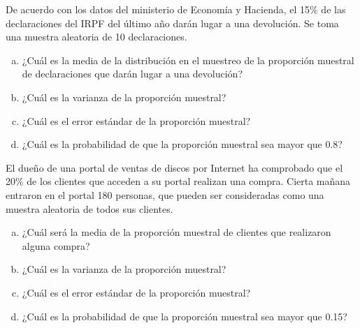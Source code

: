 \documentclass[12pt]{article}\usepackage[]{graphicx}\usepackage[]{color}
\begin{document}
\begin{prob}
De acuerdo con los datos del ministerio de Economía y Hacienda, el
15\% de las declaraciones del IRPF del último año darán lugar a
una devolución. Se toma una muestra aleatoria de 10 declaraciones.
\begin{enumerate}[a)]
\item ¿Cuál es la media de la distribución en el muestreo de la
proporción muestral de declaraciones que darán lugar a una
devolución?
\item ¿Cuál es la varianza de la proporción muestral?
\item ¿Cuál es el error estándar de la proporción muestral?
\item ¿Cuál es la probabilidad de que la proporción muestral sea
mayor que 0.8?
\end{enumerate}
\end{prob}


\begin{prob}
El dueño de una portal de ventas de discos por Internet ha comprobado que el 20\% de los
clientes que acceden a su portal realizan una compra. Cierta mañana
entraron en el portal 180 personas, que pueden ser consideradas como
una muestra aleatoria de todos sus clientes.
\begin{enumerate}[a)]
\item ¿Cuál será la media de la proporción muestral de clientes
que realizaron alguna compra?
\item ¿Cuál es la varianza de la proporción muestral?
\item ¿Cuál es el error estándar de la proporción muestral?
\item ¿Cuál es la probabilidad de que la proporción muestral sea
mayor que 0.15?
\end{enumerate}
\end{prob}
\end{document}
